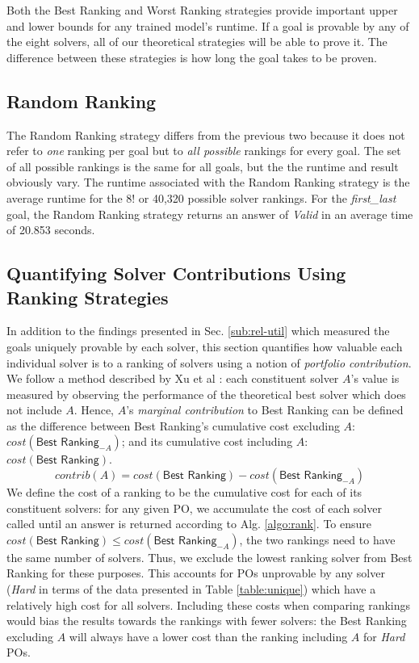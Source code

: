 Both the \textsf{Best Ranking} and \textsf{Worst Ranking} strategies provide important upper and lower bounds for any trained model's runtime.
If a goal is provable by any of the eight solvers, all of our theoretical strategies will be able to prove it.
The difference between these strategies is how long the goal takes to be proven.  

\subsection{\textsf{Random Ranking}}

The \textsf{Random Ranking} strategy differs from the previous two because it does not refer to \textit{one} ranking per goal but to \textit{all possible} rankings for every goal.
The set of all possible rankings is the same for all goals, but the the runtime and result obviously vary. 
The runtime associated with the \textsf{Random Ranking} strategy is the average runtime for the 8! or 40,320 possible solver rankings.
For the \textit{first\_last} goal, the \textsf{Random Ranking} strategy returns an answer of \textit{Valid} in an average time of 20.853 seconds.

\subsection{Quantifying Solver Contributions Using Ranking Strategies}

\sloppypar
In addition to the findings presented in Sec. \ref{sub:rel-util} which measured the goals uniquely provable by each solver, this section quantifies how valuable each individual solver is to a ranking of solvers using a notion of \textit{portfolio contribution}.
We follow a method described by Xu et al \cite{Xu2012}: each constituent solver $A$'s value is measured by observing the performance of the theoretical best solver which does not include $A$.
Hence, $A$'s \textit{marginal contribution} to \textsf{Best Ranking} can be defined as the difference between \textsf{Best Ranking}'s cumulative cost excluding $A$: $cost(\textsf{Best Ranking}_{-A})$; and its cumulative cost including $A$: $cost(\textsf{Best Ranking})$.
\[
	contrib(A) = cost(\textsf{Best Ranking}) - cost(\textsf{Best Ranking}_{-A})
\]
We define the cost of a ranking to be the cumulative cost for each of its constituent solvers:
for any given PO, we accumulate the cost of each solver called until an answer is returned according to Alg. \ref{algo:rank}.
To ensure $cost(\textsf{Best Ranking}) \leq cost(\textsf{Best Ranking}_{-A})$, the two rankings need to have the same number of solvers. 
Thus, we exclude the lowest ranking solver from \textsf{Best Ranking} for these purposes.
This accounts for POs unprovable by any solver (\textit{Hard} in terms of the data presented in Table \ref{table:unique}) which have a relatively high cost for all solvers. 
Including these costs when comparing rankings would bias the results towards the rankings with fewer solvers: the \textsf{Best Ranking} excluding $A$ will always have a lower cost than the ranking including $A$ for \textit{Hard} POs.   

